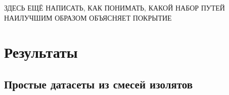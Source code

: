 \documentclass{spbau-diploma}
\begin{document}
ЗДЕСЬ ЕЩЁ НАПИСАТЬ, КАК ПОНИМАТЬ, КАКОЙ НАБОР ПУТЕЙ НАИЛУЧШИМ ОБРАЗОМ ОБЪЯСНЯЕТ ПОКРЫТИЕ






\section{Результаты}
\subsection{Простые датасеты из смесей изолятов}
\end{document}
